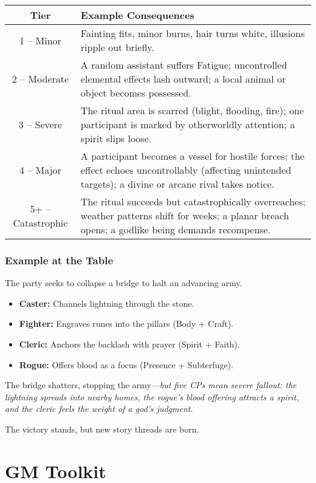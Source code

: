 \documentclass[12pt]{book}
\begin{document}
\begin{tabular}{|c|p{10cm}|}
\hline
\textbf{Tier} & \textbf{Example Consequences} \\
\hline
1 -- Minor & Fainting fits, minor burns, hair turns white, illusions ripple out briefly. \\
\hline
2 -- Moderate & A random assistant suffers Fatigue; uncontrolled elemental effects lash outward; a local animal or object becomes possessed. \\
\hline
3 -- Severe & The ritual area is scarred (blight, flooding, fire); one participant is marked by otherworldly attention; a spirit slips loose. \\
\hline
4 -- Major & A participant becomes a vessel for hostile forces; the effect echoes uncontrollably (affecting unintended targets); a divine or arcane rival takes notice. \\
\hline
5+ -- Catastrophic & The ritual succeeds but catastrophically overreaches: weather patterns shift for weeks; a planar breach opens; a godlike being demands recompense. \\
\hline
\end{tabular}

\section*{Example at the Table}
The party seeks to collapse a bridge to halt an advancing army.
\begin{itemize}
  \item \textbf{Caster:} Channels lightning through the stone. 
  \item \textbf{Fighter:} Engraves runes into the pillars (Body + Craft). 
  \item \textbf{Cleric:} Anchors the backlash with prayer (Spirit + Faith). 
  \item \textbf{Rogue:} Offers blood as a focus (Presence + Subterfuge). 
\end{itemize}

The bridge shatters, stopping the army—\emph{but five CPs mean severe fallout: the lightning spreads into nearby homes, the rogue’s blood offering attracts a spirit, and the cleric feels the weight of a god’s judgment}. 

The victory stands, but new story threads are born.


\part{GM Toolkit}
\end{document}
